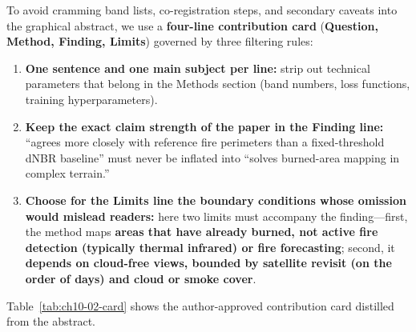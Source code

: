 To avoid cramming band lists, co-registration steps, and secondary caveats into the graphical abstract, we use a \textbf{four-line contribution card} (\textbf{Question, Method, Finding, Limits}) governed by three filtering rules:
\begin{enumerate}
\item \textbf{One sentence and one main subject per line:} strip out technical parameters that belong in the Methods section (band numbers, loss functions, training hyperparameters).
\item \textbf{Keep the exact claim strength of the paper in the Finding line:} ``agrees more closely with reference fire perimeters than a fixed-threshold dNBR baseline'' must never be inflated into ``solves burned-area mapping in complex terrain.''
\item \textbf{Choose for the Limits line the boundary conditions whose omission would mislead readers:} here two limits must accompany the finding---first, the method maps \textbf{areas that have already burned, not active fire detection (typically thermal infrared) or fire forecasting}; second, it \textbf{depends on cloud-free views, bounded by satellite revisit (on the order of days) and cloud or smoke cover}.
\end{enumerate}

Table~\ref{tab:ch10-02-card} shows the author-approved contribution card distilled from the abstract.

